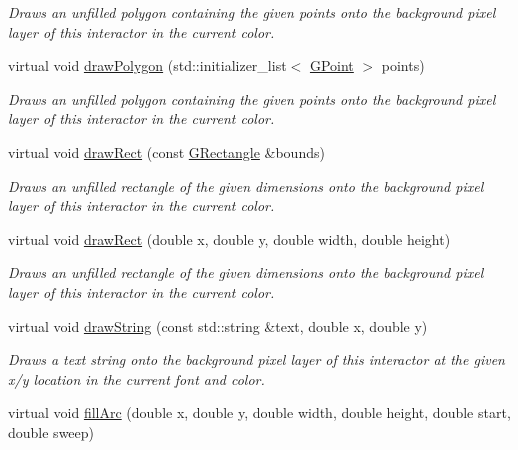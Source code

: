 \begin{DoxyCompactItemize}
\begin{DoxyCompactList}\small\item\em Draws an unfilled polygon containing the given points onto the background pixel layer of this interactor in the current color. \end{DoxyCompactList}\item 
virtual void \mbox{\hyperlink{classsgl_1_1GDrawingSurface_a021ee881e0d154dc4dd059698742889c}{draw\+Polygon}} (std\+::initializer\+\_\+list$<$ \mbox{\hyperlink{structsgl_1_1GPoint}{G\+Point}} $>$ points)
\begin{DoxyCompactList}\small\item\em Draws an unfilled polygon containing the given points onto the background pixel layer of this interactor in the current color. \end{DoxyCompactList}\item 
virtual void \mbox{\hyperlink{classsgl_1_1GDrawingSurface_a3dd4cc5891149dfc36746264f7289877}{draw\+Rect}} (const \mbox{\hyperlink{structsgl_1_1GRectangle}{G\+Rectangle}} \&bounds)
\begin{DoxyCompactList}\small\item\em Draws an unfilled rectangle of the given dimensions onto the background pixel layer of this interactor in the current color. \end{DoxyCompactList}\item 
virtual void \mbox{\hyperlink{classsgl_1_1GDrawingSurface_a4148e770ffc5474153aadd4814dbd708}{draw\+Rect}} (double x, double y, double width, double height)
\begin{DoxyCompactList}\small\item\em Draws an unfilled rectangle of the given dimensions onto the background pixel layer of this interactor in the current color. \end{DoxyCompactList}\item 
virtual void \mbox{\hyperlink{classsgl_1_1GDrawingSurface_ad4e8551a753a77135792bbee97013675}{draw\+String}} (const std\+::string \&text, double x, double y)
\begin{DoxyCompactList}\small\item\em Draws a text string onto the background pixel layer of this interactor at the given x/y location in the current font and color. \end{DoxyCompactList}\item 
virtual void \mbox{\hyperlink{classsgl_1_1GDrawingSurface_a228075ad18bd97b57f9956568c4773f3}{fill\+Arc}} (double x, double y, double width, double height, double start, double sweep)

\end{DoxyCompactItemize}
